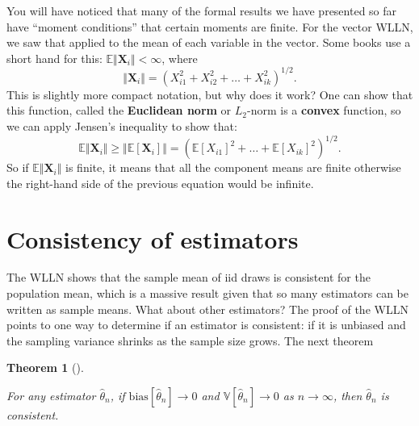 \documentclass[
  letterpaper,
  DIV=11,
  numbers=noendperiod]{scrreprt}
\newcommand{\mb}{\symbf}
\newcommand{\E}{\mathbb{E}}
\newcommand{\V}{\mathbb{V}}
\newcommand{\X}{\mb{X}}
\theoremstyle{definition}
\theoremstyle{plain}
\newtheorem{theorem}{Theorem}[chapter]
\theoremstyle{definition}
\theoremstyle{remark}
\begin{document}
\begin{tcolorbox}[enhanced jigsaw, title=\textcolor{quarto-callout-note-color}{\faInfo}\hspace{0.5em}{Notation alert}, breakable, titlerule=0mm, opacityback=0, rightrule=.15mm, bottomrule=.15mm, colframe=quarto-callout-note-color-frame, coltitle=black, colbacktitle=quarto-callout-note-color!10!white, bottomtitle=1mm, toptitle=1mm, colback=white, arc=.35mm, opacitybacktitle=0.6, toprule=.15mm, leftrule=.75mm, left=2mm]

You will have noticed that many of the formal results we have presented
so far have ``moment conditions'' that certain moments are finite. For
the vector WLLN, we saw that applied to the mean of each variable in the
vector. Some books use a short hand for this:
\(\E\Vert \X_i\Vert < \infty\), where \[
\Vert\X_i\Vert = \left(X_{i1}^2 + X_{i2}^2 + \ldots + X_{ik}^2\right)^{1/2}. 
\] This is slightly more compact notation, but why does it work? One can
show that this function, called the \textbf{Euclidean norm} or
\(L_2\)-norm is a \textbf{convex} function, so we can apply Jensen's
inequality to show that: \[
\E\Vert \X_i\Vert \geq \Vert \E[\X_i] \Vert = (\E[X_{i1}]^2 + \ldots + \E[X_{ik}]^2)^{1/2}.
\] So if \(\E\Vert \X_i\Vert\) is finite, it means that all the
component means are finite otherwise the right-hand side of the previous
equation would be infinite.

\end{tcolorbox}

\hypertarget{consistency-of-estimators}{%
\section{Consistency of estimators}\label{consistency-of-estimators}}

The WLLN shows that the sample mean of iid draws is consistent for the
population mean, which is a massive result given that so many estimators
can be written as sample means. What about other estimators? The proof
of the WLLN points to one way to determine if an estimator is
consistent: if it is unbiased and the sampling variance shrinks as the
sample size grows. The next theorem

\leavevmode{}%
\begin{theorem}[]\label{thm-consis}

For any estimator \(\widehat{\theta}_n\), if
\(\text{bias}[\widehat{\theta}_n] \to 0\) and
\(\V[\widehat{\theta}_n] \rightarrow 0\) as \(n\rightarrow \infty\),
then \(\widehat{\theta}_n\) is consistent.

\end{theorem}
\end{document}
